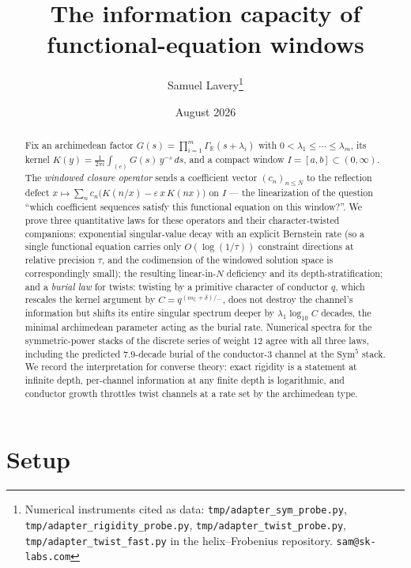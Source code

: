 \documentclass[11pt]{article}
\title{The information capacity of functional-equation windows}
\author{Samuel Lavery\thanks{Numerical instruments cited as data:
\texttt{tmp/adapter\_sym\_probe.py}, \texttt{tmp/adapter\_rigidity\_probe.py},
\texttt{tmp/adapter\_twist\_probe.py}, \texttt{tmp/adapter\_twist\_fast.py} in the
helix--Frobenius repository.  \texttt{sam@sk-labs.com}}}
\date{August 2026}
\theoremstyle{definition}
\theoremstyle{remark}
\newcommand{\R}{\mathbb{R}}
\newcommand{\C}{\mathbb{C}}
\newcommand{\GR}{\Gamma_{\R}}
\begin{document}
\maketitle

\begin{abstract}
Fix an archimedean factor $G(s)=\prod_{i=1}^{m}\GR(s+\lambda_i)$ with
$0<\lambda_1\le\cdots\le\lambda_m$, its kernel
$K(y)=\frac{1}{2\pi i}\int_{(c)}G(s)\,y^{-s}\,ds$, and a compact window
$I=[a,b]\subset(0,\infty)$.  The \emph{windowed closure operator} sends a
coefficient vector $(c_n)_{n\le N}$ to the reflection defect
$x\mapsto\sum_n c_n\bigl(K(n/x)-\varepsilon\,x\,K(nx)\bigr)$ on $I$ --- the
linearization of the question ``which coefficient sequences satisfy this
functional equation on this window?''.  We prove three quantitative laws for
these operators and their character-twisted companions: exponential
singular-value decay with an explicit Bernstein rate (so a single functional
equation carries only $O(\log(1/\tau))$ constraint directions at relative
precision $\tau$, and the codimension of the windowed solution space is
correspondingly small); the resulting linear-in-$N$ deficiency and its
depth-stratification; and a \emph{burial law} for twists: twisting by a
primitive character of conductor $q$, which rescales the kernel argument by
$C=q^{(m_{\C}+\delta)/\dots}$, does not destroy the channel's information but
shifts its entire singular spectrum deeper by
$\lambda_1\log_{10}C$ decades, the minimal archimedean parameter acting as
the burial rate.  Numerical spectra for the symmetric-power stacks of the
discrete series of weight $12$ agree with all three laws, including the
predicted $7.9$-decade burial of the conductor-$3$ channel at the
$\mathrm{Sym}^5$ stack.  We record the interpretation for converse theory:
exact rigidity is a statement at infinite depth, per-channel information at
any finite depth is logarithmic, and conductor growth throttles twist
channels at a rate set by the archimedean type.
\end{abstract}

\section{Setup}\label{sec:setup}
\end{document}
